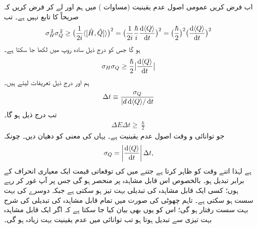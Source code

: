 اب فرض کریں عمومی اصول عدم یقینیت (مساوات ) میں ہم  اور  لے کر فرض کریں کہ  صریحاً  کا تابع نہیں ہے۔ تب
\begin{align*}
\sigma_{H}^{\,2} \sigma_{Q}^{\,2} \geq \big( \frac{1}{2i} \langle [ \hat{H}, \hat{Q} ] \rangle \big)^{2} = \big( \frac{1}{2i} \frac{\hslash}{i} \frac{\dif \, \langle Q \rangle}{\dif t} \big)^{2} = \big( \frac{\hslash}{2} \big)^{2} \big( \frac{\dif\, \langle Q \rangle}{\dif t} \big)^{2} 
\end{align*}
ہو گا جس کو درج ذیل سادہ روپ میں لکھا جا سکتا ہے۔ 
\begin{align*}
\sigma_{H} \sigma_{Q} \geq \frac{\hslash}{2} \big | \frac{\dif \,\langle Q \rangle}{\dif t} \big| 
\end{align*}
ہم  اور درج ذیل تعریفات لیتے ہیں۔
\begin{align}
\Delta t \equiv \frac{\sigma_{Q}}{|d\dif\, \langle Q \rangle / \dif t} 
\end{align}
تب درج ذیل ہو گا۔
\begin{align}\label{مساوات_قواعد_توانائی_و_وقت_اصول_عدم_یقینیت}
\Delta E \Delta t \geq \frac{\hslash}{2}
\end{align}
جو توانائی و وقت اصول عدم یقینیت ہے۔ یہاں  کی معنی کو دھیان دیں۔ چونکہ 
\begin{align*}
\sigma_{Q} = \left| \frac{\dif\, \langle Q \rangle}{\dif t} \right| \Delta t ,
\end{align*}
ہے لہٰذا  اتنے وقت کو ظاہر کرتا ہے جتنے میں  کی توقعاتی قیمت ایک معیاری انحراف کے برابر تبدیل ہو۔ بالخصوص  اس قابل مشاہدہ  پر منحصر ہو گی جس پر آپ غور کر رہے ہوں؛ کسی ایک قابل مشاہدہ کی تبدیلی بہت تیز ہو سکتی ہے جبکہ دوسرے کی بہت سست ہو سکتی ہے۔ تاہم چھوٹی  کی صورت میں تمام قابل مشاہدہ کی تبدیلی کی شرح بہت سست رفتار ہو گی؛ اس کو یوں بھی بیان کیا جا سکتا ہے کہ اگر ایک قابل مشاہدہ بہت تیزی سے تبدیل ہوتا ہو تب توانائی میں عدم یقینیت بہت زیادہ ہو گی۔

